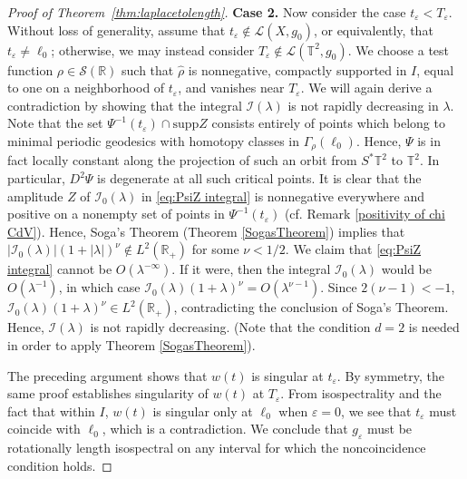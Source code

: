 \documentclass[11pt,letterpaper,oneside]{amsart}
\newcommand{\R}{\mathbb{R}}
\newcommand{\T}{\mathbb{T}}
\newcommand{\supp}{\text{supp}}
\theoremstyle{definition}
\theoremstyle{remark}
\newcommand{\eps}{\varepsilon}
\newcommand{\wh}{\widehat}
\newcommand{\I}{\mathcal{I}}
\theoremstyle{definition}
\theoremstyle{remark}
\newcommand{\CL}{\mathcal{L}}
\begin{document}
\begin{proof}[Proof of Theorem~\ref{thm:laplacetolength}]
    \medskip
    
    \noindent \textbf{Case 2.} Now consider the case $t_\eps < T_\eps$. Without loss of generality, assume that $t_\eps \notin \CL(X,g_0)$, or equivalently, that $t_\eps \neq \ell_0$; otherwise, we may instead consider $T_\eps \notin \CL(\T^2,g_0)$. We choose a test function $\rho \in \mathscr{S}(\R)$ such that $\wh{\rho}$ is nonnegative, compactly supported in $I$, equal to one on a neighborhood of $t_\eps$, and vanishes near $T_\eps$. We will again derive a contradiction by showing that the integral $\I(\lambda)$ is not rapidly decreasing in $\lambda$. {Note that the set $\Psi^{-1}(t_\eps) \cap \supp Z$ consists entirely of points which belong to minimal periodic geodesics with homotopy classes in $\Gamma_\rho(\ell_0)$. Hence, $\Psi$ is in fact locally constant along the projection of such an orbit from $S^* \T^2$ to $\T^2$. In particular, $D^2 \Psi$ is degenerate at all such critical points. It is clear that the amplitude $Z$ of $\I_0(\lambda)$ in \eqref{eq:PsiZ integral} is nonnegative everywhere and positive on a nonempty set of points in $\Psi^{-1}(t_\eps)$ (cf. Remark \ref{positivity of chi CdV}).} Hence, Soga's Theorem (Theorem \ref{SogasTheorem}) implies that $|\I_0(\lambda)| (1 + |\lambda|)^{\nu} \notin L^2(\R_+)$ for some $\nu < 1/2$. We claim that \eqref{eq:PsiZ integral} cannot be $O(\lambda^{-\infty})$. If it were, then the integral $\I_0(\lambda)$ would be $O(\lambda^{-1})$, in which case $\I_0(\lambda) (1 + \lambda)^\nu = O(\lambda^{\nu - 1})$. Since $2(\nu - 1) < -1$, $\I_0(\lambda) (1+ \lambda)^{\nu} \in L^2(\R_+)$, contradicting the conclusion of Soga's Theorem. Hence, $\I(\lambda)$ is not rapidly decreasing. (Note that the condition $d = 2$ is needed in order to apply Theorem \ref{SogasTheorem}).

    \medskip

    The preceding argument shows that $w(t)$ is singular at $t_\eps$. By symmetry, the same proof establishes singularity of $w(t)$ at $T_\eps$. From isospectrality and the fact that within $I$, $w(t)$ is singular only at $\ell_0$ when $\eps = 0$, we see that $t_\eps$ must coincide with $\ell_0$, which is a contradiction. We conclude that $g_\eps$ must be rotationally length isospectral on any interval for which the noncoincidence condition holds.
    
\end{proof}
    
\end{document}
